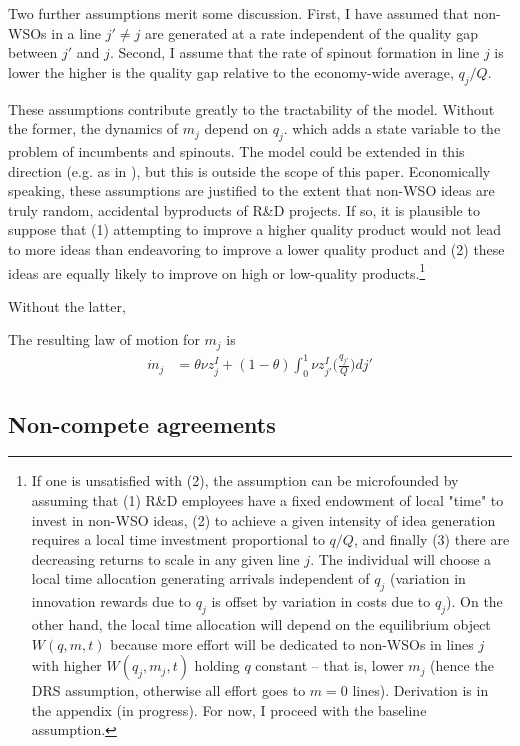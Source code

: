 \documentclass[12pt,english]{article}
\theoremstyle{remark}
\begin{document}
Two further assumptions merit some discussion. First, I have assumed that non-WSOs in a line $j' \ne j$ are generated at a rate independent of the quality gap between $j'$ and $j$. Second, I assume that the rate of spinout formation in line $j$ is lower the higher is the quality gap relative to the economy-wide average, $q_j/Q$. 

These assumptions contribute greatly to the tractability of the model. Without the former, the dynamics of $m_j$ depend on $q_j$. which adds a state variable to the problem of incumbents and spinouts. The model could be extended in this direction (e.g. as in \cite{acemoglu_innovation_2015}), but this is outside the scope of this paper. Economically speaking, these assumptions are justified to the extent that non-WSO ideas are truly random, accidental byproducts of R\&D projects. If so, it is plausible to suppose that (1) attempting to improve a higher quality product would not lead to more ideas than endeavoring to improve a lower quality product and (2) these ideas are equally likely to improve on high or low-quality products.\footnote{If one is unsatisfied with (2), the assumption can be microfounded by assuming that (1) R\&D employees have a fixed endowment of local "time" to invest in non-WSO ideas, (2) to achieve a given intensity of idea generation requires a local time investment proportional to $q/Q$, and finally (3) there are decreasing returns to scale in any given line $j$. The individual will choose a local time allocation generating arrivals independent of $q_j$ (variation in innovation rewards due to $q_j$ is offset by variation in costs due to $q_j$). On the other hand, the local time allocation will depend on the equilibrium object $W(q,m,t)$ because more effort will be dedicated to non-WSOs in lines $j$ with higher $W(q_j,m_j,t)$ holding $q$ constant -- that is, lower $m_j$ (hence the DRS assumption, otherwise all effort goes to $m = 0$ lines). Derivation is in the appendix (in progress). For now, I proceed with the baseline assumption.}

Without the latter, 

The resulting law of motion for $m_j$ is 
\begin{align}
	\dot{m}_j &= \theta \nu z^I_j + (1-\theta) \int_0^1 \nu z^I_{j'} \Big(\frac{q_{j'}}{Q} \Big)dj' \label{m_law_of_motion}
\end{align}

\subsection{Non-compete agreements}
\end{document}
